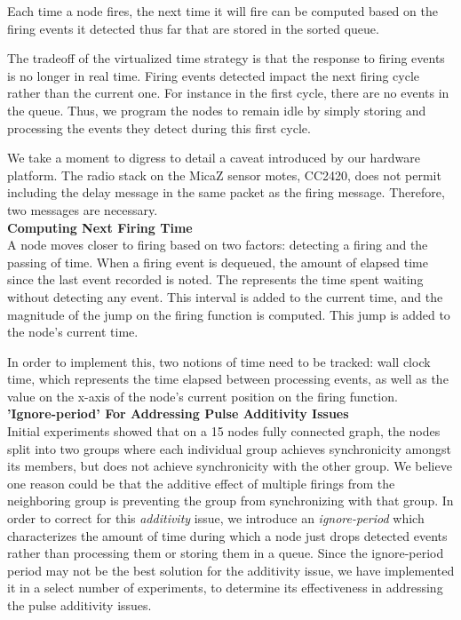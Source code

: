 Each time a node fires, the next time it will fire can be computed
based on the firing events it detected thus far that are 
stored in the sorted queue.

The tradeoff of the virtualized time strategy is that the response to firing events
is no longer in real time. Firing events detected impact the next firing cycle rather than
the current one. For instance in the first cycle, there are no events in the queue.
Thus, we program the nodes to remain idle by simply storing and processing the events
they detect during this first cycle.

We take a moment to digress to detail a caveat introduced by our hardware
platform. The radio stack on the MicaZ sensor motes, CC2420, does not
permit including the delay message in the same packet as the firing message.
Therefore, two messages are necessary.\\

\noindent
{\bf Computing Next Firing Time}  \\
A node moves closer to firing based on two factors: detecting a firing
and the passing of time. When a firing event is dequeued, the amount of 
elapsed time since the last event recorded is noted.
The represents the time spent waiting without detecting any event. 
This interval is added to the current time, and the magnitude of the jump
on the firing function is computed. This jump is added to the node's 
current time.

In order to implement this, two notions of time need to be tracked:
wall clock time,  which represents the time elapsed between processing
events, as well as the value on the x-axis of the node's current
position on the firing function. \\

\noindent
{\bf 'Ignore-period' For Addressing Pulse Additivity Issues}  \\
Initial experiments showed that on a 15 nodes fully connected graph,
the nodes split into two groups where each individual group achieves synchronicity
amongst its members, but does not achieve synchronicity with the other group.
We believe one reason could be that the additive effect of multiple firings
from the neighboring group is preventing the group from synchronizing with
that group. In order to correct for this \emph{additivity} issue, we 
introduce an \emph{ignore-period} which characterizes the amount of time
during which a node just drops detected events rather than processing
them or storing them in a queue.  Since the ignore-period period may
not be the best solution for the additivity issue, we have implemented
it in a select number of experiments, to determine its effectiveness
in addressing the pulse additivity issues.

